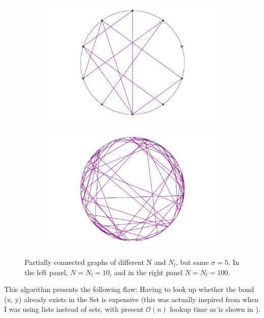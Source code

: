 \begin{figure}[t]
	\begin{subfigure}{0.5\textwidth}
	\centering
	\includegraphics[width=\textwidth]{figures/partially-connected-graph.pdf}
\end{subfigure}
	\begin{subfigure}{0.5\textwidth}
	\centering
	\includegraphics[width=\textwidth]{figures/partially-connected-graph-many-points-nPoints-100-nBonds-100-sigma-5.pdf}
\end{subfigure}
	\caption{Partially connected graphs of different N and $N_l$, but same $\sigma=5$. In the left panel, $N=N_l=10$, and in the right panel $N=N_l=100$.}
	\label{fig:a-partially-connected-graph}
\end{figure}

This algorithm presents the following flaw: Having to look up whether the bond (x, y) already exists in the Set is expensive (this was actually inspired from when I was using lists instead of sets, with present $\mathcal{O}(n)$ lookup time as is shown in \cite{setTime}).

